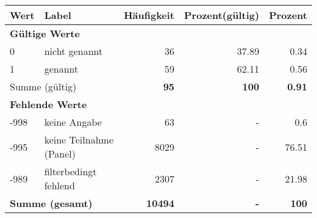      \begin{longtable}{lXrrr}
     \toprule
     \textbf{Wert} & \textbf{Label} & \textbf{Häufigkeit} & \textbf{Prozent(gültig)} & \textbf{Prozent} \\
     \endhead
     \midrule
     \multicolumn{5}{l}{\textbf{Gültige Werte}}\\

     0 &
     \multicolumn{1}{X}{ nicht genannt   } &


       \num{36} &
       \num[round-mode=places,round-precision=2]{37,89} &
         \num[round-mode=places,round-precision=2]{0,34} \\

     1 &
     \multicolumn{1}{X}{ genannt   } &


       \num{59} &
       \num[round-mode=places,round-precision=2]{62,11} &
         \num[round-mode=places,round-precision=2]{0,56} \\
     \midrule
     \multicolumn{2}{l}{Summe (gültig)} &
       \textbf{\num{95}} &
     \textbf{100} &
       \textbf{\num[round-mode=places,round-precision=2]{0,91}} \\
     \multicolumn{5}{l}{\textbf{Fehlende Werte}}\\
       -998 &
       keine Angabe &
         \num{63} &
        - &
         \num[round-mode=places,round-precision=2]{0,6} \\
       -995 &
       keine Teilnahme (Panel) &
         \num{8029} &
        - &
         \num[round-mode=places,round-precision=2]{76,51} \\
       -989 &
       filterbedingt fehlend &
         \num{2307} &
        - &
         \num[round-mode=places,round-precision=2]{21,98} \\
     \midrule
     \multicolumn{2}{l}{\textbf{Summe (gesamt)}} &
          \textbf{\num{10494}} &
        \textbf{-} &
        \textbf{100} \\
     \bottomrule
     \end{longtable}
     
